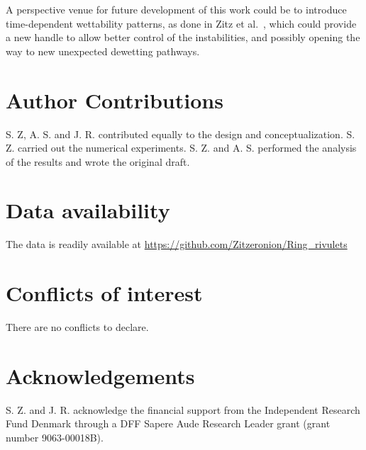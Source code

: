 \documentclass[twoside,twocolumn,9pt]{article}
\renewcommand{\refname}{Notes and references}
\begin{document}
A perspective venue for future development of this work could be to introduce time-dependent wettability patterns, as done in Zitz et al.~\cite{zitzControllingDewettingMorphologies2023}, which could provide a new handle to allow better control of the instabilities, and possibly opening the way to new unexpected dewetting pathways.

\section*{Author Contributions}
S. Z, A. S. and J. R.  contributed equally to the design and conceptualization. S. Z. carried out the numerical experiments. S. Z. and A. S. performed the analysis of the results and wrote the original draft. 

\section*{Data availability}
The data is readily available at \href{https://github.com/Zitzeronion/Ring_rivulets}{https://github.com/Zitzeronion/Ring\_rivulets}

\section*{Conflicts of interest}
There are no conflicts to declare.

\section*{Acknowledgements}
S. Z. and J. R. acknowledge the financial support from the Independent Research Fund Denmark through a DFF Sapere Aude Research Leader grant (grant number 9063-00018B).





\balance

\end{document}
